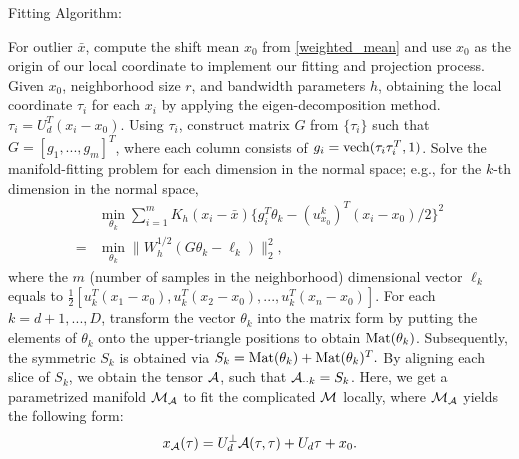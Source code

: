 \documentclass{article}
\theoremstyle{remark}
\begin{document}
\begin{algorithm}[ht]
\caption{Fitting Algorithm:}
\label{alg:Fitting}
\begin{small}
\begin{algorithmic}
\STATE [1.] For outlier $\bar{x}$, compute the shift mean $x_0$ from \eqref{weighted_mean} and use $x_0$ as the origin of our local coordinate to implement our fitting and projection process.
\STATE [2.] Given $x_0$, neighborhood size $r$, and bandwidth parameters $h$, obtaining the local coordinate $\tau_i$ for each $x_i$ by applying the eigen-decomposition method.
$
{\tau}_i = U_d^T(x_i-x_0).%
$
Using $\tau_i$, construct matrix $G$ from $\{\tau_i\}$ such that $G = [g_1,...,g_m]^T$, where each column consists of $g_i = {\rm vech}(\tau_i\tau_i^T, 1)$.%
\STATE [3.] Solve the manifold-fitting problem for each dimension in the normal space; e.g., %
for the $k$-th dimension in the normal space,
\[
\begin{aligned}
  &\min_{\theta_k} \sum_{i=1}^m K_h(x_i-\bar{x})\{ g_i^T \theta_k  -  {(u^k_{x_0})}^T (x_i -x_0)/2\}^2\\
= &\min_{\theta_k}\|W_h^{1/2}(G \theta_k-\ell_k) \|_2^2,
\end{aligned}
\]
where the $m$ (number of samples in the neighborhood) dimensional vector $\ell_k$ equals to $\frac{1}{2}[u_k^T(x_1-x_0), u_k^T(x_2-x_0),...,u_k^T(x_n-x_0)]$.
\STATE [4.] For each $k=d+1,...,D$, transform the vector $\theta_k$ into the matrix form by putting the elements of $\theta_k$ onto the upper-triangle positions to obtain ${\rm Mat}(\theta_k)$.  Subsequently, the symmetric $S_k$ is obtained via %
$
S_k = {\rm Mat}(\theta_k) + {\rm Mat}(\theta_k) ^T.
$
By aligning each slice of $S_k$, we obtain the tensor $\cal A$, such that ${\cal A}_{\cdot \cdot k}=S_k$.
Here, we get a parametrized manifold ${\cal M_A}$ to fit the complicated $\cal M$ locally, where ${\cal M_A}$ yields the following form:
\[
x_{\cal A}(\tau) = U_{d}^{\perp} {\cal A} (\tau, \tau) + U_d \tau +x_0.
\]
\end{algorithmic}
\end{small}
\end{algorithm}
\vspace{-2mm}
\end{document}
